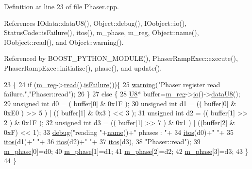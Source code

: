 Definition at line 23 of file Phaser.\+cpp.



References I\+Odata\+::data\+U8(), Object\+::debug(), I\+Oobject\+::io(), Status\+Code\+::is\+Failure(), itos(), m\+\_\+phase, m\+\_\+reg, Object\+::name(), I\+Oobject\+::read(), and Object\+::warning().



Referenced by B\+O\+O\+S\+T\+\_\+\+P\+Y\+T\+H\+O\+N\+\_\+\+M\+O\+D\+U\+L\+E(), Phaser\+Ramp\+Exec\+::execute(), Phaser\+Ramp\+Exec\+::initialize(), phase(), and update().


\begin{DoxyCode}
23                   \{
24   \textcolor{keywordflow}{if} (\hyperlink{classPhaser_ab6d751d77cb1e39723a6ac85d4cfec0c}{m\_reg}->\hyperlink{classIOobject_aa07610c11963b1db6710e3c76ceea456}{read}().\hyperlink{classStatusCode_a5dd22dc6eb2c52fc4cabc58f6dea2eb7}{isFailure}())\{
25     \hyperlink{classObject_a65cd4fda577711660821fd2cd5a3b4c9}{warning}(\textcolor{stringliteral}{"Phaser register read failure."},\textcolor{stringliteral}{"Phaser::read"});
26   \}
27   \textcolor{keywordflow}{else} \{
28     \hyperlink{ICECALv3_8h_a3cb25ca6f51f003950f9625ff05536fc}{U8}* buffer=\hyperlink{classPhaser_ab6d751d77cb1e39723a6ac85d4cfec0c}{m\_reg}->\hyperlink{classIOobject_af04fb94137c3d86849f478ac5afab5d1}{io}()->\hyperlink{classIOdata_a75e9c318dbac3a39402179070943d4bc}{dataU8}();
29     \textcolor{keywordtype}{unsigned} \textcolor{keywordtype}{int} d0 = (  buffer[0] & 0x1F );
30     \textcolor{keywordtype}{unsigned} \textcolor{keywordtype}{int} d1 = (( buffer[0] & 0xE0 ) >> 5 ) | (( buffer[1] & 0x3 ) << 3 );
31     \textcolor{keywordtype}{unsigned} \textcolor{keywordtype}{int} d2 = (( buffer[1] >> 2 ) & 0x1F );
32     \textcolor{keywordtype}{unsigned} \textcolor{keywordtype}{int} d3 = (( buffer[1] >> 7 ) & 0x1 )  | ((buffer[2] & 0xF) << 1);
33     \hyperlink{classObject_aac010553f022165573714b7014a15f0d}{debug}(\textcolor{stringliteral}{"reading "}+\hyperlink{classObject_a300f4c05dd468c7bb8b3c968868443c1}{name}()+\textcolor{stringliteral}{" phases : "}+
34         \hyperlink{Tools_8h_af330027dbdafb9a30768b3613c553e60}{itos}(d0)+\textcolor{stringliteral}{" "}+
35         \hyperlink{Tools_8h_af330027dbdafb9a30768b3613c553e60}{itos}(d1)+\textcolor{stringliteral}{" "}+
36         \hyperlink{Tools_8h_af330027dbdafb9a30768b3613c553e60}{itos}(d2)+\textcolor{stringliteral}{" "}+
37         \hyperlink{Tools_8h_af330027dbdafb9a30768b3613c553e60}{itos}(d3),
38         \textcolor{stringliteral}{"Phaser::read"});
39     \hyperlink{classPhaser_a04df9ce4afe7a36ccaba5e5e727d504e}{m\_phase}[0]=d0;
40     \hyperlink{classPhaser_a04df9ce4afe7a36ccaba5e5e727d504e}{m\_phase}[1]=d1;
41     \hyperlink{classPhaser_a04df9ce4afe7a36ccaba5e5e727d504e}{m\_phase}[2]=d2;
42     \hyperlink{classPhaser_a04df9ce4afe7a36ccaba5e5e727d504e}{m\_phase}[3]=d3;
43   \}
44 \}
\end{DoxyCode}
\mbox{\label{classPhaser_a3a4b64dc36e5f74292d9bec55da077a7}} 
